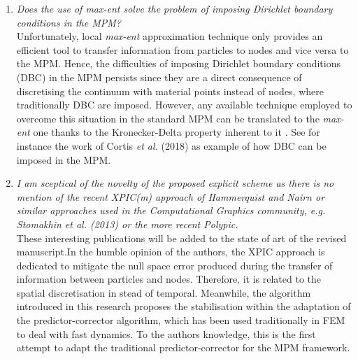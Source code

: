 \documentclass[12pt]{article}
\begin{document}
\begin{enumerate}
Concerning the first issue mentioned by the reviewer, the special case of non-convex domains was discussed by Arroyo \& Ortiz~\cite{Arroyo2006}. Some of the solutions proposed by the aforementioned authors are : the possibility of replacing the Euclidean distance $\lVert  x - x_a  \rVert$ in the definition of the shape functions by the length of the shortest path contained within the domain connecting $x$ and $x_a$. Or the decomposition of the non-convex domain into convex sub-domains.  This topic has also been extensively studied in the context of MLS-based meshfree methods, for instance visibility, diffraction, and constrained path criteria. These methods are directly applicable to local \textit{max-ent} approximation. 

\item \textit{Does the use of max-ent solve the problem of imposing Dirichlet boundary conditions in the MPM?}\\

Unfortunately, local \textit{max-ent} approximation technique only provides an efficient tool to transfer information from particles to nodes and vice versa to the MPM. Hence, the difficulties of imposing Dirichlet boundary conditions (DBC) in the MPM persists since they are a direct consequence of discretising the continuum with material points instead of nodes, where traditionally DBC are imposed. However, any available technique employed to overcome this situation in the standard MPM can be translated to the \textit{max-ent} one thanks to the Kronecker-Delta property inherent to it \cite{Arroyo2006}. See for instance the work of Cortis {\it et al.} (2018) \cite{Cortis_et_al_2017_IJNME} as example of how DBC can be imposed in the MPM.

\item \textit{I am sceptical of the novelty of the proposed explicit scheme as there is no mention of the recent XPIC(m) approach of Hammerquist and Nairn or similar approaches used in the Computational Graphics community, e.g. Stomakhin et al. (2013) or the more recent Polypic.}\\

These interesting publications will be added to the state of art of the revised manuscript.In the humble opinion of the authors, the XPIC approach is dedicated to mitigate the null space error produced during the transfer of information between particles and nodes. Therefore, it is related to the spatial discretisation in stead of temporal. Meanwhile, the algorithm introduced in this research proposes the stabilisation within the adaptation of the predictor-corrector algorithm, which has been used traditionally in FEM to deal with fast dynamics. To the author\textquotesingle s knowledge, this is the first attempt to adapt the  traditional predictor-corrector for the MPM framework. 

\end{enumerate}
\end{document}
